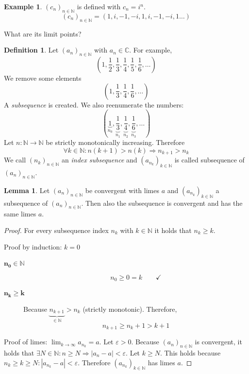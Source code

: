 \documentclass[a4paper,landscape,twocolumn]{article}
\theoremstyle{definition}
\newtheorem{defi}{Definition}
\newtheorem{ex}{Example}
\newtheorem{lemma}{Lemma}
\newcommand\abs[1]{\left|#1\right|}
\newcommand\seq[1]{{\left(#1\right)}_{n \in \mathbb N}}
\begin{document}
\begin{ex}
  $\seq{c_n}$ is defined with $c_n = i^n$.
  \[ \seq{c_n} = (1, i, -1, -i, 1, i, -1, -i, 1 \dots) \]

  What are its limit points?
\end{ex}

\begin{defi}
  Let $\seq{a_n}$ with $a_n \in \mathbb C$. For example,
  \[ \left(1, \frac12, \frac13, \frac14, \frac15, \frac16, \dots\right) \]
  We remove some elements
  \[ \left(1, \frac13, \frac14, \frac16, \dots\right) \]
  A \emph{subsequence} is created.
  We also reenumerate the numbers:
  \[ \left(\underbrace{1}_{n_0}, \underbrace{\frac13}_{n_1}, \underbrace{\frac14}_{n_2}, \underbrace{\frac16}_{n_3}, \dots\right) \]
  Let $n: \mathbb N \to \mathbb N$ be strictly monotonically increasing.
  Therefore
  \[ \forall k \in \mathbb N: n (k+1) > n(k) \Rightarrow n_{k+1} > n_k \]
  We call $\seq{n_k}$ an \emph{index subsequence} and $\left(a_{n_k}\right)_{k \in \mathbb N}$ is called subsequence of $\seq{a_n}$.
\end{defi}

\begin{lemma}
  Let $\seq{a_n}$ be convergent with limes $a$ and $\left(a_{n_k}\right)_{k \in \mathbb N}$ a subsequence of $\seq{a_n}$.
  Then also the subsequence is convergent and has the same limes $a$.
\end{lemma}
\begin{proof}
  For every subsequence index $n_k$ with $k \in \mathbb N$ it holds that $n_k \geq k$.

  Proof by induction: $k=0$
  \begin{description}
    \item[$\mathbf{n_0 \in \mathbb N}$] \[ n_0 \geq 0 = k \qquad\checkmark \]
    \item[$\mathbf{n_k \geq k}$]
      Because $\underbrace{n_{k+1}}_{\in \mathbb N} > n_k$ (strictly monotonic).
      Therefore,
      \[ n_{k+1} \geq n_k + 1 > k + 1 \]
  \end{description}

  Proof of limes: $\lim_{k\to\infty} a_{n_k} = a$.
  Let $\varepsilon > 0$. Because $\seq{a_n}$ is convergent, it holds that
  $\exists N \in \mathbb N: n \geq N \Rightarrow \abs{a_n - a} < \varepsilon$.
  Let $k \geq N$. This holds because $n_k \geq k \geq N: \abs{a_{n_k} - a} < \varepsilon$.
  Therefore $\left(a_{n_k}\right)_{k \in \mathbb N}$ has limes $a$.
\end{proof}
\end{document}
